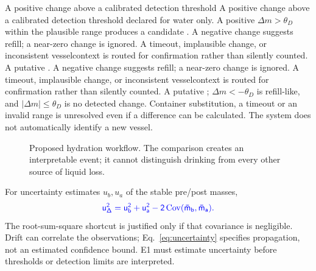 \documentclass[conference]{IEEEtran}
\providecommand{\DIFadd}[1]{{\protect\color{blue} \sf #1}} %
\providecommand{\DIFdel}[1]{{\protect\color{red} \ifmmode #1\else\scriptsize #1\fi}} %
\providecommand{\DIFaddbegin}{} %
\providecommand{\DIFaddend}{} %
\providecommand{\DIFdelbegin}{} %
\providecommand{\DIFdelend}{} %
\providecommand{\DIFaddFL}[1]{\DIFadd{#1}} %
\begin{document}
\DIFdel{A positive change above a calibrated detection threshold }\DIFdelend \DIFaddbegin \DIFadd{declared for water only. A positive $\Delta m>\theta_D$ within the plausible range }\DIFaddend produces a candidate\DIFdelbegin \DIFdel{. A negative change suggests refill; a near-zero change is ignored. A timeout, implausible change, or inconsistent vesselcontext is routed for confirmation rather than silently counted. A putative }\DIFdelend \DIFaddbegin \DIFadd{; $\Delta m<-\theta_D$ is refill-like, and $|\Delta m|\leq\theta_D$ is no detected change. Container substitution, a timeout or an invalid range is unresolved even if a difference can be calculated. The system does not automatically identify a new vessel.
}

\begin{figure}[t]
\centering
{}
\caption{\DIFaddFL{Proposed hydration workflow. The comparison creates an interpretable event; it cannot distinguish drinking from every other source of liquid loss.}}\label{fig:fsm}
\end{figure}


\DIFadd{For uncertainty estimates $u_b,u_a$ of the stable pre/post masses,
}\begin{equation}\DIFadd{u_{\Delta}^2=u_b^2+u_a^2-2\operatorname{Cov}(\bar m_b,\bar m_a).
\label{eq:uncertainty}}\end{equation}
\DIFadd{The root-sum-square shortcut is justified only if that covariance is negligible. Drift can correlate the observations; Eq.~\eqref{eq:uncertainty} specifies propagation, not an estimated confidence bound. E1 must estimate uncertainty before thresholds or detection limits are interpreted.
}
\end{document}
